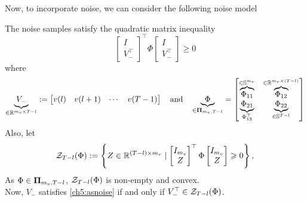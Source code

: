 Now, to incorporate noise, we can consider the following noise model
\begin{assumption} \label{ch5:assumption on noise samplesio}
The noise samples satisfy the quadratic matrix inequality
\begin{equation} 
    \label{ch5:asnoise}
    \begin{bmatrix}
    I \\ V_-^\top 
    \end{bmatrix}^\top 
    \Phi
    \begin{bmatrix}
    I \\ V_-^\top 
    \end{bmatrix} \geq 0
\end{equation}
where
\begin{equation} \label{ch5:eq:Phiio}
\underbrace{V_-}_{\in\mathbb{R}^{m_v\times T-l}} := \bbm v(l) & v(l+1) & \cdots & v(T-1)    \ebm \quad\text{and}\quad\underbrace{\Phi}_{\in \bpi_{m_v, T-l}} = \bbm \overbrace{\Phi_{11}}^{\in \S{m_v}}  & \overbrace{\Phi_{12}}^{\in \mathbb{R}^{m_v \times (T-l)}} \\ \underbrace{\Phi_{21}}_{\Phi_{12}^\top} & \underbrace{\Phi_{22}}_{\in \S{T-l}} \ebm
\end{equation}
Also, let
\begin{equation} \label{ch0:e:Zr}
\calZ_{T-l}(\Phi):=\left\{ Z\in\R^{(T-l)\times {m_v}} \mid \bbm I_{m_v}\\Z\ebm^\top\Phi\bbm I_{m_v}\\Z\ebm\geq 0\right\},
\end{equation}
As $\Phi \in \mathbf{\Pi}_{m_v,T-l}$, $\mathcal{Z}_{T-l}(\Phi)$ is non-empty and convex.\\
Now,  $V_-$ satisfies \eqref{ch5:asnoise} if and only if $V_-^\top \in \mathcal{Z}_{T-l}(\Phi)$.
\end{assumption}

